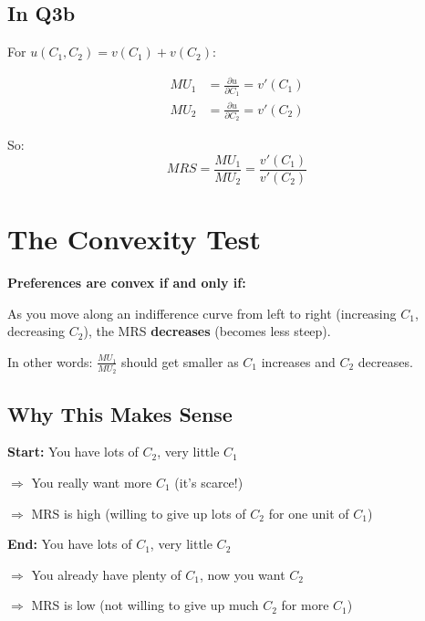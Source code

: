 \documentclass[12pt]{article}
\begin{document}
\subsection*{In Q3b}

For $u(C_1, C_2) = v(C_1) + v(C_2)$:

\begin{align*}
MU_1 &= \frac{\partial u}{\partial C_1} = v'(C_1) \\
MU_2 &= \frac{\partial u}{\partial C_2} = v'(C_2)
\end{align*}

So:
\[
MRS = \frac{MU_1}{MU_2} = \frac{v'(C_1)}{v'(C_2)}
\]

\section*{The Convexity Test}

\begin{tcolorbox}[colback=green!5!white,colframe=green!75!black]
\textbf{Preferences are convex if and only if:}

As you move along an indifference curve from left to right (increasing $C_1$, decreasing $C_2$), the MRS \textbf{decreases} (becomes less steep).

\vspace{0.3cm}

In other words: $\frac{MU_1}{MU_2}$ should get smaller as $C_1$ increases and $C_2$ decreases.
\end{tcolorbox}

\subsection*{Why This Makes Sense}

\textbf{Start:} You have lots of $C_2$, very little $C_1$

$\Rightarrow$ You really want more $C_1$ (it's scarce!)

$\Rightarrow$ MRS is high (willing to give up lots of $C_2$ for one unit of $C_1$)

\vspace{0.3cm}

\textbf{End:} You have lots of $C_1$, very little $C_2$

$\Rightarrow$ You already have plenty of $C_1$, now you want $C_2$

$\Rightarrow$ MRS is low (not willing to give up much $C_2$ for more $C_1$)

\vspace{0.3cm}
\end{document}
